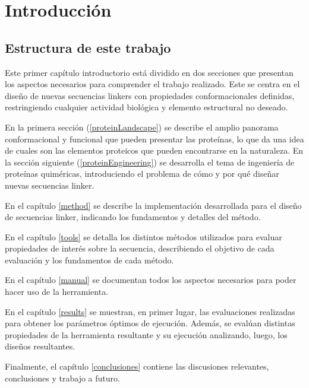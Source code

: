 \chapter{Introducci\'on}



\section{Estructura de este trabajo}

Este primer capítulo introductorio está dividido en dos secciones que presentan los aspectos necesarios para comprender el trabajo realizado. Este se centra en el diseño de nuevas secuencias linkers 
con propiedades conformacionales definidas, restringiendo cualquier actividad biológica y elemento estructural no deseado.

En la primera sección (\ref{proteinLandscape}) se describe el amplio panorama conformacional y funcional que pueden presentar las proteínas, lo que da una idea de cuales son las elementos proteicos que pueden encontrarse en la naturaleza.
En la sección siguiente (\ref{proteinEngineering}) se desarrolla el tema de ingeniería de proteínas quiméricas, introduciendo el problema de cómo y por qué diseñar nuevas secuencias linker.

En el capítulo \ref{method} se describe la implementación desarrollada para el diseño de secuencias linker, indicando los fundamentos y detalles del método.

En el capítulo \ref{tools} se detalla los distintos métodos utilizados para evaluar propiedades de interés sobre la secuencia, describiendo el objetivo de cada evaluación y los fundamentos de cada método. 

En el capítulo \ref{manual} se documentan todos los aspectos necesarios para poder hacer uso de la herramienta.

En el capítulo \ref{results} se muestran, en primer lugar, las evaluaciones realizadas para obtener los parámetros óptimos de ejecución. 
Además, se evalúan distintas propiedades de la herramienta resultante y su ejecución analizando, luego, los diseños resultantes. 

Finalmente, el capítulo \ref{conclusiones} contiene las discusiones relevantes, conclusiones y trabajo a futuro.






